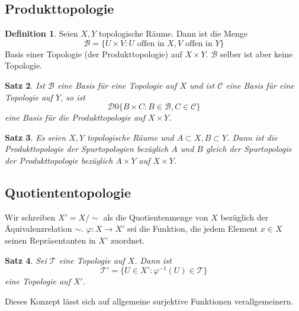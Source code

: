 \documentclass[a4paper, 12pt]{article}
\theoremstyle{plain}
\newtheorem{theorem}{Satz}[section] %
\theoremstyle{definition}
\newtheorem{definition}[theorem]{Definition} %
\theoremstyle{lemma}
\theoremstyle{remark}
\theoremstyle{corollary}
\theoremstyle{example}
\begin{document}
	\subsection{Produkttopologie}
	\begin{definition}
		Seien $X,Y$ topologische Räume. Dann ist die Menge \[\mathcal{B} = \{U\times V: U \text{ offen in } X, V \text{ offen in } Y\}\] Basis einer Topologie (der Produkttopologie) auf $X\times Y$. $\mathcal{B}$ selber ist aber keine Topologie.
	\end{definition}
	\begin{theorem}
		Ist $\mathcal{B}$ eine Basis für eine Topologie auf $X$ und ist $\mathcal{C}$ eine Basis für eine Topologie auf $Y$, so ist \[\mathcal{D} 0 \{B\times C: B \in \mathcal{B}, C \in \mathcal{C}\}\] eine Basis für die Produkttopologie auf $X\times Y$.
	\end{theorem}
	\begin{theorem}
		Es seien $X,Y$ topologische Räume und $A\subset X, B\subset Y$. Dann ist die Produkttopologie der Spurtopologien bezüglich $A$ und $B$ gleich der Spurtopologie der Produkttopologie bezüglich $A\times Y$ auf $X\times Y$.
	\end{theorem}
	\subsection{Quotiententopologie}
	Wir schreiben $X' = X/\sim$ als die Quotientenmenge von $X$ bezüglich der Äquivalenzrelation $\sim$. $\varphi: X \to X'$ sei die Funktion, die jedem Element $x \in X$ seinen Repräsentanten in $X'$ zuordnet.
	\begin{theorem}
		Sei $\mathcal{T}$ eine Topologie auf $X$. Dann ist \[\mathcal{T}' = \{U \in X': \varphi^{-1}(U) \in \mathcal{T}\}\] eine Topologie auf $X'$.
	\end{theorem}
	Dieses Konzept lässt sich auf allgemeine surjektive Funktionen verallgemeinern.
\end{document}
